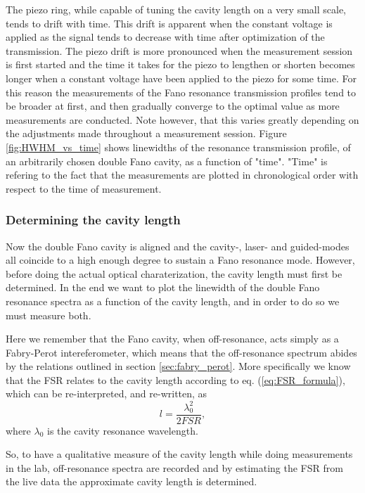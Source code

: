 The piezo ring, while capable of tuning the cavity length on a very small scale, tends to drift with time. This drift is apparent when the constant voltage is applied as the signal tends to decrease with time after optimization of the transmission. The piezo drift is more pronounced when the measurement session is first started and the time it takes for the piezo to lengthen or shorten becomes longer when a constant voltage have been applied to the piezo for some time. For this reason the measurements of the Fano resonance transmission profiles tend to be broader at first, and then gradually converge to the optimal value as more measurements are conducted. Note however, that this varies greatly depending on the adjustments made throughout a measurement session. Figure \ref{fig:HWHM_vs_time} shows linewidths of the resonance transmission profile, of an arbitrarily chosen double Fano cavity, as a function of "time". "Time" is refering to the fact that the measurements are plotted in chronological order with respect to the time of measurement. 

\subsubsection{Determining the cavity length}

Now the double Fano cavity is aligned and the cavity-, laser- and guided-modes all coincide to a high enough degree to sustain a Fano resonance mode. However, before doing the actual optical charaterization, the cavity length must first be determined. In the end we want to plot the linewidth of the double Fano resonance spectra as a function of the cavity length, and in order to do so we must measure both. 

Here we remember that the Fano cavity, when off-resonance, acts simply as a Fabry-Perot intereferometer, which means that the off-resonance spectrum abides by the relations outlined in section \ref{sec:fabry_perot}. More specifically we know that the FSR relates to the cavity length according to eq. (\ref{eq:FSR_formula}), which can be re-interpreted, and re-written, as
\begin{equation}
    l = \frac{\lambda_0^2}{2 FSR},
\end{equation}
where $\lambda_0$ is the cavity resonance wavelength. 

So, to have a qualitative measure of the cavity length while doing measurements in the lab, off-resonance spectra are recorded and by estimating the FSR from the live data the approximate cavity length is determined.  

